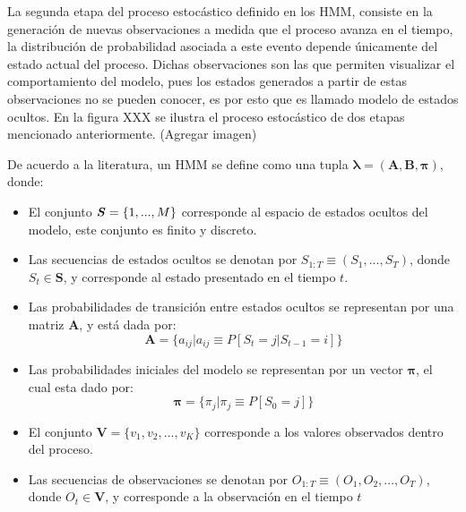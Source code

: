 La segunda etapa del proceso estocástico definido en los HMM, consiste en la generación de nuevas observaciones a medida que el proceso avanza en el tiempo, la distribución de probabilidad asociada a este evento depende únicamente del estado actual del proceso. Dichas observaciones son las que permiten visualizar el comportamiento del modelo, pues los estados generados a partir de estas observaciones no se pueden conocer, es por esto que es llamado modelo de estados ocultos. En la figura XXX se ilustra el proceso estocástico de dos etapas mencionado anteriormente. (Agregar imagen)

De acuerdo a la literatura, un HMM se define como una tupla $\boldsymbol\lambda = ( \textbf{A} , \textbf{B} , \boldsymbol\pi )$, donde:

\begin{itemize}
    \item El conjunto $\textbf{\textit{S}} = \lbrace 1,...,M \rbrace$ corresponde al espacio de estados ocultos del modelo, este conjunto es finito y discreto.

    \item Las secuencias de estados ocultos se denotan por $S_{1:T} \equiv ( S_{1},...,S_{T} )$, donde $S_{t} \in \textbf{S}$, y corresponde al estado presentado en el tiempo $t$.

    \item Las probabilidades de transición entre estados ocultos se representan por una matriz \textbf{A}, y está dada por:
        \begin{equation}
            \textbf{A} = \lbrace a_{ij} \vert a_{ij} \equiv P \left[S_{t} = j \vert S_{t-1} = i \right] \rbrace
        \end{equation}

    \item Las probabilidades iniciales del modelo se representan por un vector $\boldsymbol\pi$, el cual esta dado por: 
        \begin{equation}
            \boldsymbol\pi = \lbrace \pi_{j} \vert \pi_{j} \equiv P \left[S_{0} = j \right] \rbrace
        \end{equation}
        
    \item El conjunto $\textbf{V} = \lbrace v_{1}, v_{2},...,v_{K} \rbrace$ corresponde a los valores observados dentro del proceso.

    \item Las secuencias de observaciones se denotan por $O_{1:T} \equiv ( O_{1}, O_{2}, ..., O_{T} )$, donde $O_{t} \in \textbf{V}$, y corresponde a la observación en el tiempo $t$


\end{itemize}
